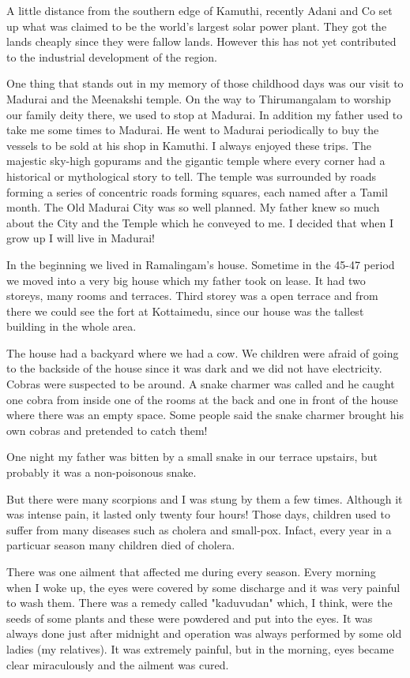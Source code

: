 A little distance from the southern edge of Kamuthi, recently Adani and 
Co set up what was claimed to be the world's largest solar power plant. 
They got the lands cheaply since they were fallow lands. However this 
has not yet contributed to the industrial development of the region.

One thing that stands out in my memory of those childhood days was our 
visit to Madurai and the Meenakshi temple. On the way to Thirumangalam 
to worship our family deity there, we used to stop at Madurai. In 
addition my father used to take me some times to Madurai. He went to 
Madurai periodically to buy the vessels to be sold at his shop in 
Kamuthi. I always enjoyed these trips. The majestic sky-high gopurams 
and the gigantic temple where every corner had a historical or 
mythological story to tell. The temple was surrounded by roads forming a 
series of concentric roads forming squares, each named after a Tamil 
month. The Old Madurai City was so well planned. My father knew so much 
about the City and the Temple which he conveyed to me. I decided that 
when I grow up I will live in Madurai!

In the beginning we lived in Ramalingam's house. Sometime in the 45-47 
period we moved into a very big house which my father took on lease. It 
had two storeys, many rooms and terraces. Third storey was a open 
terrace and from there we could see the fort at Kottaimedu, since our 
house was the tallest building in the whole area.

The house had a backyard where we had a cow. We children were afraid of 
going to the backside of the house since it was dark and we did not have 
electricity. Cobras were suspected to be around. A snake charmer was 
called and he caught one cobra from inside one of the rooms at the back 
and one in front of the house where there was an empty space. Some 
people said the snake charmer brought his own cobras and pretended to 
catch them!

One night my father was bitten by a small snake in our terrace upstairs, 
but probably it was a non-poisonous snake.

But there were many scorpions and I was stung by them a few times. 
Although it was intense pain, it lasted only twenty four hours! Those 
days, children used to suffer from many diseases such as cholera and 
small-pox. Infact, every year in a particuar season many children died 
of cholera. 

There was one ailment that affected me during every season. 
Every morning when I woke up, the eyes were covered by some discharge 
and it was very painful to wash them. There was a remedy called 
"kaduvudan" which, I think, were the seeds of some plants and these were 
powdered and put into the eyes. It was always done just after midnight 
and operation was always performed by some old ladies (my relatives). It 
was extremely painful, but in the morning, eyes became clear 
miraculously and the ailment was cured.

